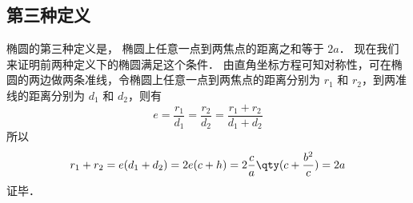 \subsection{第三种定义}
椭圆的第三种定义是， 椭圆上任意一点到两焦点的距离之和等于 $2a$． 现在我们来证明前两种定义下的椭圆满足这个条件． 由直角坐标方程可知对称性，可在椭圆的两边做两条准线，令椭圆上任意一点到两焦点的距离分别为 $r_1$ 和 $r_2$，到两准线的距离分别为 $d_1$ 和 $d_2$，则有
\begin{equation}
e = \frac{r_1}{d_1} = \frac{r_2}{d_2} = \frac{r_1 + r_2}{d_1 + d_2}
\end{equation}
所以
\begin{equation}\label{Elips3_eq9}
r_1 + r_2 = e(d_1+d_2) = 2e(c + h) = 2\frac{c}{a} \qty( c + \frac{b^2}{c} ) = 2a
\end{equation}
证毕．
